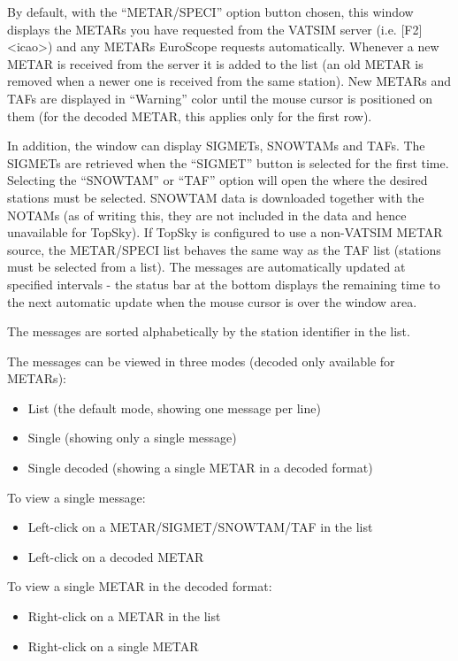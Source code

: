 \documentclass[11pt,a4paper,oldfontcommands]{memoir}
\begin{document}
By default, with the “METAR/SPECI” option button chosen, this window displays the METARs you have requested from the VATSIM server (i.e. [F2] <icao>) and any METARs EuroScope requests automatically. Whenever a new METAR is received from the server it is added to the list (an old METAR is removed when a newer one is received from the same station). New METARs and TAFs are displayed in “Warning” color until the mouse cursor is positioned on them (for the decoded METAR, this applies only for the first row).

In addition, the window can display SIGMETs, SNOWTAMs and TAFs. The SIGMETs are retrieved when the “SIGMET” button is selected for the first time. Selecting the “SNOWTAM” or “TAF” option will open the \textit{} where the desired stations must be selected. SNOWTAM data is downloaded together with the NOTAMs (as of writing this, they are not included in the data and hence unavailable for TopSky). If TopSky is configured to use a non-VATSIM METAR source, the METAR/SPECI list behaves the same way as the TAF list (stations must be selected from a list). The messages are automatically updated at specified intervals - the status bar at the bottom displays the remaining time to the next automatic update when the mouse cursor is over the window area.

The messages are sorted alphabetically by the station identifier in the list.

The messages can be viewed in three modes (decoded only available for METARs):

\begin{itemize}
    \item List (the default mode, showing one message per line)
    \item Single (showing only a single message)
    \item Single decoded (showing a single METAR in a decoded format)
\end{itemize}

To view a single message:

\begin{itemize}
    \item Left-click on a METAR/SIGMET/SNOWTAM/TAF in the list
    \item Left-click on a decoded METAR
\end{itemize}

To view a single METAR in the decoded format:

\begin{itemize}
    \item Right-click on a METAR in the list
    \item Right-click on a single METAR
\end{itemize}
\end{document}
